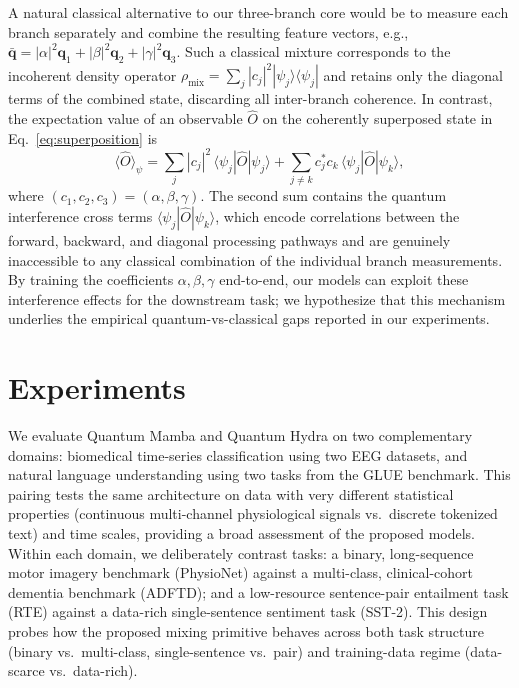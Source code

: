 \documentclass[conference]{IEEEtran}
\begin{document}
A natural classical alternative to our three-branch core would be to measure each branch separately and combine the resulting feature vectors, e.g., $\bar{\mathbf{q}} = |\alpha|^2 \mathbf{q}_1 + |\beta|^2 \mathbf{q}_2 + |\gamma|^2 \mathbf{q}_3$.
Such a classical mixture corresponds to the incoherent density operator $\rho_{\text{mix}} = \sum_j |c_j|^2 |\psi_j\rangle\langle\psi_j|$ and retains only the diagonal terms of the combined state, discarding all inter-branch coherence.
In contrast, the expectation value of an observable $\hat{O}$ on the coherently superposed state in Eq.~\eqref{eq:superposition} is
\begin{equation}
    \langle\hat{O}\rangle_{\psi} = \sum_{j} |c_j|^2\, \langle\psi_j|\hat{O}|\psi_j\rangle + \sum_{j \neq k} c_j^{*} c_k\, \langle\psi_j|\hat{O}|\psi_k\rangle,
    \label{eq:interference}
\end{equation}
where $(c_1, c_2, c_3) = (\alpha, \beta, \gamma)$.
The second sum contains the quantum interference cross terms $\langle\psi_j|\hat{O}|\psi_k\rangle$, which encode correlations between the forward, backward, and diagonal processing pathways and are genuinely inaccessible to any classical combination of the individual branch measurements.
By training the coefficients $\alpha, \beta, \gamma$ end-to-end, our models can exploit these interference effects for the downstream task; we hypothesize that this mechanism underlies the empirical quantum-vs-classical gaps reported in our experiments.


\section{Experiments}
\label{sec:experiments}

We evaluate Quantum Mamba and Quantum Hydra on two complementary domains: biomedical time-series classification using two EEG datasets, and natural language understanding using two tasks from the GLUE benchmark.
This pairing tests the same architecture on data with very different statistical properties (continuous multi-channel physiological signals vs.\ discrete tokenized text) and time scales, providing a broad assessment of the proposed models.
Within each domain, we deliberately contrast tasks: a binary, long-sequence motor imagery benchmark (PhysioNet) against a multi-class, clinical-cohort dementia benchmark (ADFTD); and a low-resource sentence-pair entailment task (RTE) against a data-rich single-sentence sentiment task (SST-2). This design probes how the proposed mixing primitive behaves across both task structure (binary vs.\ multi-class, single-sentence vs.\ pair) and training-data regime (data-scarce vs.\ data-rich).
\end{document}
